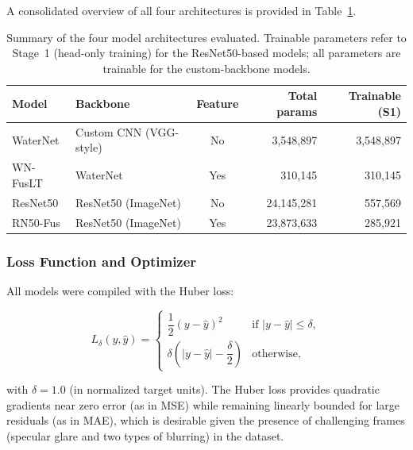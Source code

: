 A consolidated overview of all four architectures is provided in
Table~\ref{tab:model_summary}.

\begin{table}[htbp]
    \caption{Summary of the four model architectures evaluated. Trainable
             parameters refer to Stage~1 (head-only training) for the
             ResNet50-based models; all parameters are trainable for the
             custom-backbone models.}
    \begin{center}
        \begin{tabular}{|l|l|c|r|r|}
        \hline
        \textbf{Model} & \textbf{Backbone} & \textbf{Feature} &
        \textbf{Total params} & \textbf{Trainable (S1)} \\
        \hline
        WaterNet   & Custom CNN (VGG-style) & No  &  3{,}548{,}897 &  3{,}548{,}897 \\
        \hline
        WN-FusLT   & WaterNet      & Yes &    310{,}145   &    310{,}145   \\
        \hline
        ResNet50   & ResNet50 (ImageNet)    & No  & 24{,}145{,}281 &    557{,}569   \\
        \hline
        RN50-Fus   & ResNet50 (ImageNet)    & Yes & 23{,}873{,}633 &    285{,}921   \\
        \hline
        \end{tabular}
    \label{tab:model_summary}
    \end{center}
\end{table}

\subsubsection{Loss Function and Optimizer}
\label{subsubsec:loss_optim}

All models were compiled with the Huber loss:

\begin{equation}
    L_\delta(y,\hat{y}) =
    \begin{cases}
        \dfrac{1}{2}(y - \hat{y})^2
            & \text{if } |y - \hat{y}| \leq \delta, \\[8pt]
        \delta\!\left(|y - \hat{y}| - \dfrac{\delta}{2}\right)
            & \text{otherwise,}
    \end{cases}
    \label{eq:huber}
\end{equation}

\noindent with $\delta = 1.0$ (in normalized target units). The Huber loss provides quadratic gradients near zero error (as in MSE) while remaining linearly bounded for large residuals (as in MAE), which is desirable given the presence of challenging frames (specular glare and two types of blurring) in the dataset.


